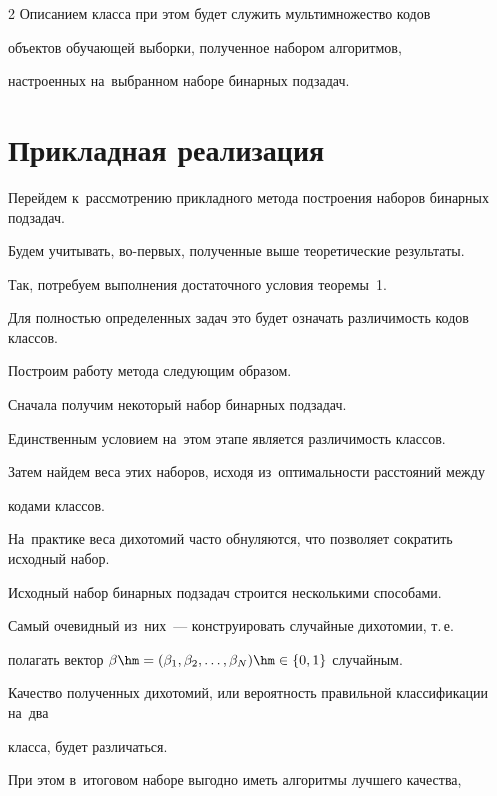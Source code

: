 \begin{multicols}{2}
Описанием класса при этом будет служить мультимножество кодов 


объектов обучающей выборки, полученное набором алгоритмов, 


настроенных на~выбранном наборе бинарных подзадач.





\section{Прикладная реализация}





Перейдем к~рассмотрению прикладного метода построения наборов бинарных подзадач.


Будем учитывать, во-первых, полученные выше теоретические результаты.


Так, потребуем выполнения достаточного условия теоремы~1.


Для полностью определенных задач это будет означать различимость кодов классов.





Построим работу метода следующим образом.


Сначала получим некоторый набор бинарных подзадач.


Единственным условием на~этом этапе является различимость классов.


Затем найдем веса этих наборов, исходя из~оптимальности рас\-сто\-яний между 


кодами классов.


На~практике веса дихотомий часто обнуляются, что позволяет сократить исходный набор.





Исходный набор бинарных подзадач строится несколькими способами.


Самый очевидный из~них~--- конструировать случайные дихотомии, т.\,е.\


 полагать вектор $\beta \hm=(\beta_{1} ,\beta_{2},\ldots,\beta_{N})


 \hm\in \{ 0,1\}$ случайным.


Качество полученных дихотомий, или вероятность правильной классификации на~два 


класса, будет различаться.


При этом в~итоговом наборе выгодно иметь алгоритмы лучшего качества, 



\end{multicols}
